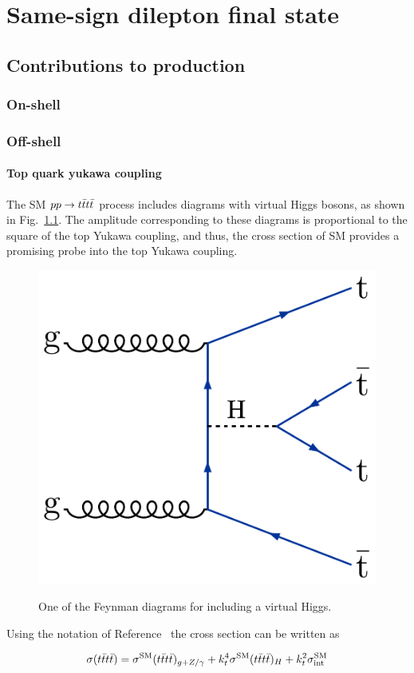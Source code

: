 \chapter{Same-sign dilepton final state}

\section{Contributions to \tttt production}

\subsection{On-shell}

\subsection{Off-shell}

\subsubsection{Top quark yukawa coupling}

The SM $pp \rightarrow t\bar{t}t\bar{t}$ process includes diagrams with virtual Higgs bosons,
as shown in Fig.~\ref{fig:feynYukawa}. 
The amplitude corresponding to these diagrams is 
proportional to the square of the top Yukawa coupling,
and thus, the cross section of SM \tttt provides
a promising probe into the top Yukawa coupling.

\begin{figure}[!hbtp]
\centering
\includegraphics[width=.35\textwidth]{figs/ftp/ftdiag3.pdf} \\
\caption{One of the Feynman diagrams for \tttt including a virtual Higgs.}
\label{fig:feynYukawa}
\end{figure}

Using the notation of Reference~\cite{THEORY:TopYukawaTTTT} the \tttt cross section can be written 
as 

\begin{equation} 
\label{eq:yukawa}
\sigma(t\bar{t}t\bar{t}) = \sigma^{\text{SM}}(t\bar{t}t\bar{t})_{g+Z/\gamma} + k_t^4 \sigma^{\text{SM}}(t\bar{t}t\bar{t})_H + k_t^2 \sigma^{\text{SM}}_{\rm int}
\end{equation} 

